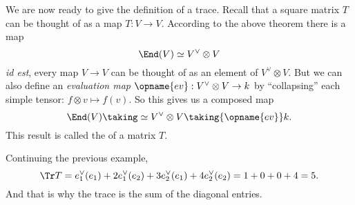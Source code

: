 We are now ready to give the definition of a trace.
Recall that a square matrix $T$ can be thought of as a map $T : V \to V$.
According to the above theorem there is a map
\[ \End(V) \simeq V^\vee \otimes V \]
\emph{id est}, every map $V \to V$ can be thought of as an element of $V^\vee \otimes V$.
But we can also define an
\emph{evaluation map} $\opname{ev} : V^\vee \otimes V \to k$
by ``collapsing'' each simple tensor: $f \otimes v \mapsto f(v)$.
So this gives us a composed map
\[ \End(V) \taking\simeq V^\vee \otimes V \taking{\opname{ev}} k. \]
This result is called the  of a matrix $T$.

\begin{example}
	Continuing the previous example,
	\[ \Tr T = e_1^\vee(e_1) + 2e_1^\vee(e_2) 
		+ 3e_2^\vee(e_1)  +4e_2^\vee(e_2)
		= 1 + 0 + 0 + 4 = 5. \]
	And that is why the trace is the sum of the diagonal entries.
\end{example}

